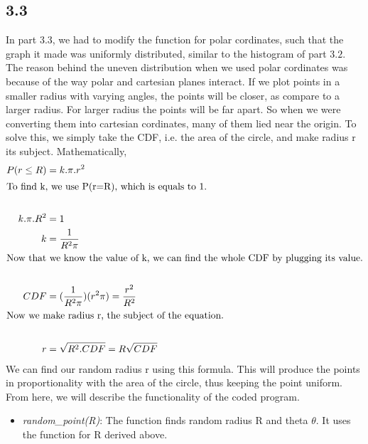 \documentclass[answers]{exam}
\begin{document}
\subsection*{3.3}
\begin{framed}
  \indent In part $3.3$, we had to modify the function for polar cordinates, such that the graph it made was uniformly distributed, similar to the histogram of part $3.2$.\\
  \indent The reason behind the uneven distribution when we used polar cordinates was because of the way polar and cartesian planes interact. If we plot points in a smaller radius with varying angles, the points will be closer, as compare to a larger radius. For larger radius the points will be far apart. So when we were converting them into cartesian cordinates, many of them lied near the origin. To solve this, we simply take the CDF, i.e. the area of the circle, and make radius r its subject. Mathematically,\\
  \begin{align*}
    P(r\leq R)&=k.\pi.r^2\\
    \intertext{To find k, we use P(r=R), which is equals to 1.}\\
    k.\pi.R^2&=1\\
    k &= \frac{1}{R^2\pi}\\
    \intertext{Now that we know the value of k, we can find the whole CDF by plugging its value.}\\
    CDF &= (\frac{1}{R^2\pi})(r^2\pi)=\frac{r^2}{R^2}\\
    \intertext{Now we make radius r, the subject of the equation.}\\
    r &= \sqrt{R^2.CDF} = R\sqrt{CDF}
  \end{align*}
  \indent We can find our random radius r using this formula. This will produce the points in proportionality with the area of the circle, thus keeping the point uniform.\\
  \indent From here, we will describe the functionality of the coded program.

  \begin{itemize}
    \item \emph{random\_point(R)}: The function finds random radius R and theta $\theta$. It uses the function for R derived above. 


\end{itemize}
\end{framed}
\end{document}
